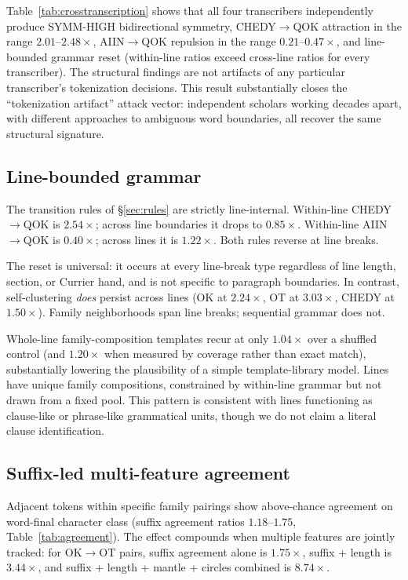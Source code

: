 \documentclass[11pt]{article}
\begin{document}
Table~\ref{tab:crosstranscription} shows that all four transcribers
independently produce SYMM-HIGH bidirectional symmetry,
CHEDY$\to$QOK attraction in the range $2.01$--$2.48\times$,
AIIN$\to$QOK repulsion in the range $0.21$--$0.47\times$, and
line-bounded grammar reset (within-line ratios exceed cross-line ratios
for every transcriber). The structural findings are not artifacts of
any particular transcriber's tokenization decisions. This result
substantially closes the ``tokenization artifact'' attack vector:
independent scholars working decades apart, with different approaches
to ambiguous word boundaries, all recover the same structural
signature.

\subsection{Line-bounded grammar}

The transition rules of \S\ref{sec:rules} are strictly line-internal.
Within-line CHEDY$\to$QOK is $2.54\times$; across line boundaries it drops
to $0.85\times$. Within-line AIIN$\to$QOK is $0.40\times$; across lines it
is $1.22\times$. Both rules reverse at line breaks.

The reset is universal: it occurs at every line-break type regardless of
line length, section, or Currier hand, and is not specific to paragraph
boundaries. In contrast, self-clustering \emph{does} persist across lines
(OK at $2.24\times$, OT at $3.03\times$, CHEDY at $1.50\times$). Family
neighborhoods span line breaks; sequential grammar does not.

Whole-line family-composition templates recur at only $1.04\times$ over a
shuffled control (and $1.20\times$ when measured by coverage rather than
exact match), substantially lowering the plausibility of a simple
template-library model. Lines have unique family compositions,
constrained by within-line grammar but not drawn from a fixed pool. This
pattern is consistent with lines functioning as clause-like or
phrase-like grammatical units, though we do not claim a literal clause
identification.

\subsection{Suffix-led multi-feature agreement}

Adjacent tokens within specific family pairings show above-chance
agreement on word-final character class (suffix agreement ratios $1.18$--$1.75$,
Table~\ref{tab:agreement}). The effect compounds when multiple features
are jointly tracked: for OK$\to$OT pairs, suffix agreement alone is
$1.75\times$, suffix + length is $3.44\times$, and suffix + length + mantle
+ circles combined is $8.74\times$.
\end{document}
